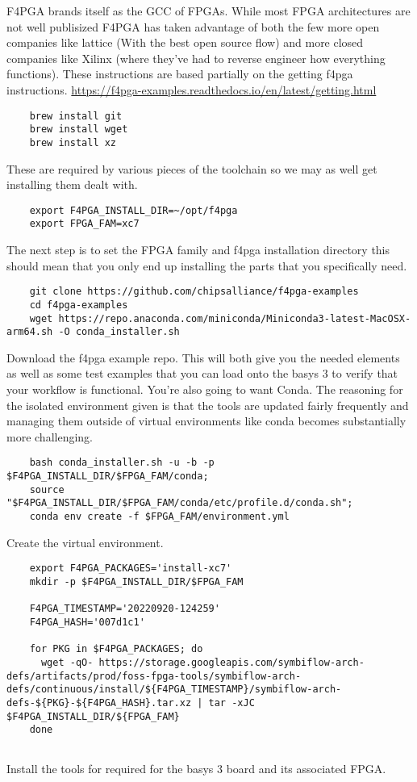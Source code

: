 F4PGA brands itself as the GCC of FPGAs. 
While most FPGA architectures are not well publisized F4PGA has taken advantage of both the few more open companies like lattice 
(With the best open source flow) and more closed companies like Xilinx (where they've had to reverse engineer how everything functions).
These instructions are based partially on the getting f4pga instructions. \href{https://f4pga-examples.readthedocs.io/en/latest/getting.html}{https://f4pga-examples.readthedocs.io/en/latest/getting.html}
\begin{verbatim}
    brew install git
    brew install wget
    brew install xz
\end{verbatim}

These are required by various pieces of the toolchain so we may as well get installing them dealt with.

\begin{verbatim}
    export F4PGA_INSTALL_DIR=~/opt/f4pga
    export FPGA_FAM=xc7
\end{verbatim}

The next step is to set the FPGA family and f4pga installation directory this should mean that you only end up installing the parts that you specifically need.

\begin{verbatim}
    git clone https://github.com/chipsalliance/f4pga-examples
    cd f4pga-examples
    wget https://repo.anaconda.com/miniconda/Miniconda3-latest-MacOSX-arm64.sh -O conda_installer.sh
\end{verbatim}

Download the f4pga example repo. This will both give you the needed elements as well as some test examples that you can load onto the basys 3 to verify that your workflow is functional.
You're also going to want Conda. The reasoning for the isolated environment given is that the tools are updated fairly frequently and managing them outside of virtual environments like conda becomes substantially more challenging.

\begin{verbatim}
    bash conda_installer.sh -u -b -p $F4PGA_INSTALL_DIR/$FPGA_FAM/conda;
    source "$F4PGA_INSTALL_DIR/$FPGA_FAM/conda/etc/profile.d/conda.sh";
    conda env create -f $FPGA_FAM/environment.yml    
\end{verbatim}

Create the virtual environment. 

\begin{verbatim}
    export F4PGA_PACKAGES='install-xc7'
    mkdir -p $F4PGA_INSTALL_DIR/$FPGA_FAM

    F4PGA_TIMESTAMP='20220920-124259'
    F4PGA_HASH='007d1c1'
    
    for PKG in $F4PGA_PACKAGES; do
      wget -qO- https://storage.googleapis.com/symbiflow-arch-defs/artifacts/prod/foss-fpga-tools/symbiflow-arch-defs/continuous/install/${F4PGA_TIMESTAMP}/symbiflow-arch-defs-${PKG}-${F4PGA_HASH}.tar.xz | tar -xJC $F4PGA_INSTALL_DIR/${FPGA_FAM}
    done
    
\end{verbatim}

Install the tools for required for the basys 3 board and its associated FPGA.